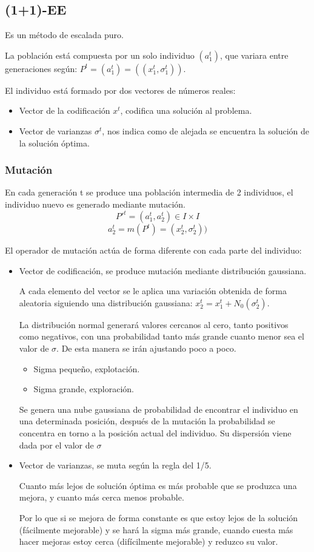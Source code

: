 \documentclass[12pt, twoside, openright]{report} %
\begin{document}
\subsection{(1+1)-EE}
Es un método de escalada puro.

La población está compuesta por un solo individuo $(a_1^t)$, que variara entre generaciones según: $P^t=(a^t_1)=((x^t_1, \sigma^t_1))$.

El individuo está formado por dos vectores de números reales: 
\begin{itemize}
	\item Vector de la codificación $x^t$, codifica una solución al problema.
	\item Vector de varianzas $\sigma^t$, nos indica como de alejada se encuentra la solución de la solución óptima.
\end{itemize}

\subsubsection{Mutación}
En cada generación t se produce una población intermedia de 2 individuos, el individuo nuevo es generado  mediante mutación.
$$P'^t=(a^t_1,a^t_2)\in I \times I$$
$$a^t_2=m(P^t)=(x^t_2, \sigma^t_2))$$

El operador de mutación actúa de forma diferente con cada parte del individuo:
\begin{itemize}
	\item Vector de codificación, se produce mutación mediante distribución gaussiana.
	
	A cada elemento del vector se le aplica una variación obtenida de forma aleatoria siguiendo una distribución gaussiana: $x^t_2=x^t_1+N_0(\sigma^t_2)$.

	La distribución normal generará valores cercanos al cero, tanto positivos como negativos, con una probabilidad tanto más grande cuanto menor sea el valor de $\sigma$. De esta manera se irán ajustando poco a poco.
	\begin{itemize}
		\item Sigma pequeño, explotación.
		\item Sigma grande, exploración.
	\end{itemize}

	Se genera una nube gaussiana de probabilidad de encontrar el individuo en una determinada posición, después de la mutación la probabilidad se concentra en torno a la posición actual del individuo. Su dispersión viene dada por el valor de $\sigma$

	\item Vector de varianzas, se muta según la regla del 1/5.
	
	Cuanto más lejos de solución óptima es más probable que se produzca una mejora, y cuanto más cerca menos probable.
	
	Por lo que si se mejora de forma constante es que estoy lejos de la solución (fácilmente mejorable) y se hará la sigma más grande, cuando cuesta más hacer mejoras estoy cerca (difícilmente mejorable) y reduzco su valor.
\end{itemize}
\end{document}
